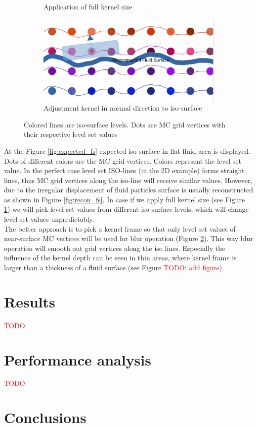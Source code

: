 \begin{figure}[H]
\begin{subfigure}[b]{0.5\textwidth}
               \caption{Application of full kernel size}
               \label{fig:full_ks}
        \end{subfigure}
        \begin{subfigure}[b]{0.5\textwidth}
               \includegraphics[width=\textwidth]{figures/LevelSetBlurKernelPart.png}
               \caption{Adjustment kernel in normal direction to iso-surface}
				\label{fig:partial_ks}
        \end{subfigure}

       \caption{Colored lines are iso-surface levels. Dots are MC grid vertices with their respective level set values}
       \label{fig:kd_surface_explenation}
 \end{figure}
At the Figure \ref{fig:expected_fs} expected iso-surface in flat fluid area is displayed. Dots of different colors are the MC grid vertices. Colors represent the level set value. In the perfect case level set ISO-lines (in the 2D example) forms straight lines, thus MC grid vertices along the iso-line will receive similar values. However, due to the irregular displacement of fluid particles surface is usually reconstructed as shown in Figure \ref{fig:recon_fs}. In case if we apply full kernel size (see Figure \ref{fig:full_ks}) we will pick level set values from different iso-surface levels, which will change level set values unpredictably.\\
The better approach is to pick a kernel frame so that only level set values of near-surface MC vertices will be used for blur operation (Figure \ref{fig:partial_ks}). This way blur operation will smooth out grid vertices along the iso lines. Especially the influence of the kernel depth can be seen in thin areas, where kernel frame is larger than a thickness of a fluid surface (see Figure \textcolor{red}{TODO: add figure}).

\section{Results}
\textcolor{red}{TODO}
\section{Performance analysis}
\textcolor{red}{TODO}
\section{Conclusions}
